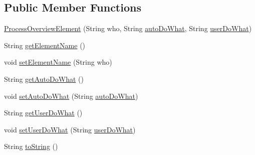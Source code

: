 \subsection*{Public Member Functions}
\begin{DoxyCompactItemize}
\item 
\hyperlink{classit_1_1isislab_1_1masonhelperdocumentation_1_1_o_d_d_1_1_process_overview_element_a354ae8ad63ee5c60e2194c00027acee2}{Process\-Overview\-Element} (String who, String \hyperlink{classit_1_1isislab_1_1masonhelperdocumentation_1_1_o_d_d_1_1_process_overview_element_a089fb4d866c8dd54cc8deca8f51127e2}{auto\-Do\-What}, String \hyperlink{classit_1_1isislab_1_1masonhelperdocumentation_1_1_o_d_d_1_1_process_overview_element_adf547a3ee1fe686d4e7cb2a446761a52}{user\-Do\-What})
\item 
String \hyperlink{classit_1_1isislab_1_1masonhelperdocumentation_1_1_o_d_d_1_1_process_overview_element_a139036853655f6b0a140a48bd91107d2}{get\-Element\-Name} ()
\item 
void \hyperlink{classit_1_1isislab_1_1masonhelperdocumentation_1_1_o_d_d_1_1_process_overview_element_a93bcf49c4b4fa3acc2f4a1f7530b9cb9}{set\-Element\-Name} (String who)
\item 
String \hyperlink{classit_1_1isislab_1_1masonhelperdocumentation_1_1_o_d_d_1_1_process_overview_element_a104c9a9f9c5a37db647d4b28cc464c00}{get\-Auto\-Do\-What} ()
\item 
void \hyperlink{classit_1_1isislab_1_1masonhelperdocumentation_1_1_o_d_d_1_1_process_overview_element_abdd4c24c71b022004d28adde5dacecad}{set\-Auto\-Do\-What} (String \hyperlink{classit_1_1isislab_1_1masonhelperdocumentation_1_1_o_d_d_1_1_process_overview_element_a089fb4d866c8dd54cc8deca8f51127e2}{auto\-Do\-What})
\item 
String \hyperlink{classit_1_1isislab_1_1masonhelperdocumentation_1_1_o_d_d_1_1_process_overview_element_abca1f48af630415bf0b6e8efd4b2189d}{get\-User\-Do\-What} ()
\item 
void \hyperlink{classit_1_1isislab_1_1masonhelperdocumentation_1_1_o_d_d_1_1_process_overview_element_aad4fc02b3b9d900bb7d528c319e8861e}{set\-User\-Do\-What} (String \hyperlink{classit_1_1isislab_1_1masonhelperdocumentation_1_1_o_d_d_1_1_process_overview_element_adf547a3ee1fe686d4e7cb2a446761a52}{user\-Do\-What})
\item 
String \hyperlink{classit_1_1isislab_1_1masonhelperdocumentation_1_1_o_d_d_1_1_process_overview_element_a52f039bed4fb2e9d55051b3429db7a3f}{to\-String} ()
\end{DoxyCompactItemize}
